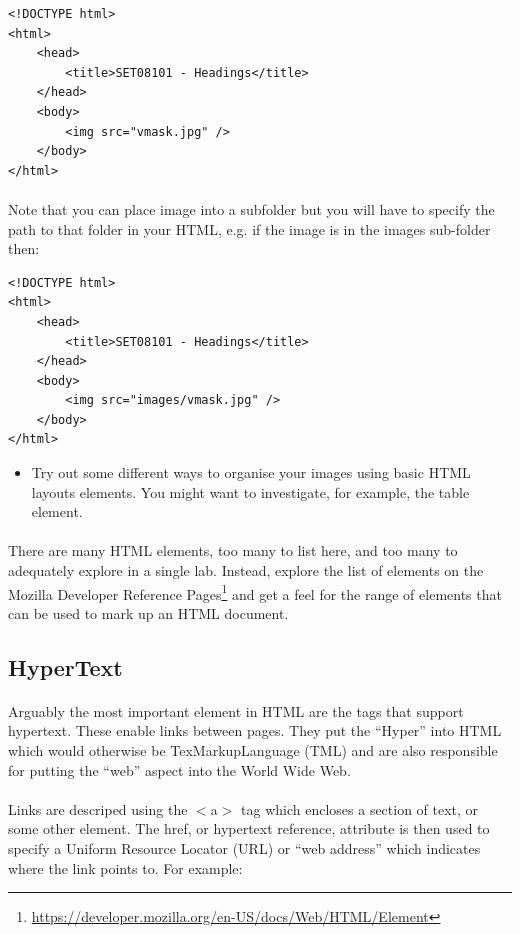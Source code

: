 \documentclass[10pt, a4paper, twosize]{article}
\begin{document}
\begin{lstlisting}
<!DOCTYPE html>
<html>
    <head>
        <title>SET08101 - Headings</title>
    </head>
    <body>
        <img src="vmask.jpg" />      
    </body>
</html>
\end{lstlisting}

\paragraph{} Note that you can place image into a subfolder but you will have to specify the path to that folder in your HTML, e.g. if the image is in the images sub-folder then:

\begin{lstlisting}
<!DOCTYPE html>
<html>
    <head>
        <title>SET08101 - Headings</title>
    </head>
    <body>
        <img src="images/vmask.jpg" /> 
    </body>
</html>
\end{lstlisting}


\begin{itemize}
\item Try out some different ways to organise your images using basic HTML layouts elements. You might want to investigate, for example, the table element.
\end{itemize}

\paragraph{} There are many HTML elements, too many to list here, and too many to adequately explore in a single lab. Instead, explore the list of elements on the Mozilla Developer Reference Pages\footnote{\url{https://developer.mozilla.org/en-US/docs/Web/HTML/Element}} and get a feel for the range of elements that can be used to mark up an HTML document.

\subsection{HyperText}
\paragraph{} Arguably the most important element in HTML are the tags that support hypertext. These enable links between pages. They put the ``Hyper'' into HTML which would otherwise be TexMarkupLanguage (TML) and are also responsible for putting the ``web'' aspect into the World Wide Web.

\paragraph{} Links are descriped using the $<$a$>$ tag which encloses a section of text, or some other element. The href, or hypertext reference, attribute is then used to specify a Uniform Resource Locator (URL) or ``web address'' which indicates where the link points to. For example:
\end{document}
